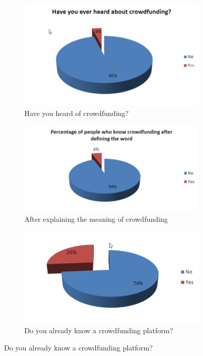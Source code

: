 \begin{center}
      
      \begin{figure}
            \begin{subfigure}{.5\textwidth}
         \centering
         \includegraphics[scale=0.30]{assets/heardCrowd.png}
         \caption{ Have you heard of crowdfunding? }
         \label{fig:heardCrowd}
      \end{subfigure}%
      
      \begin{subfigure}{.5\textwidth}
            \centering
            \includegraphics[scale=0.40]{assets/knowCrowd.png}
            \caption{After explaining the meaning of crowdfunding}
            \label{fig:knowCrowd}
      \end{subfigure}
      
      \begin{subfigure}{.5\textwidth}
            \centering
         \includegraphics[scale=0.30]{assets/knowPlatform.png}
         \caption{Do you already know a crowdfunding platform?}
         \label{fig:knowPlatform}
      \end{subfigure}
      

\end{figure}
\end{center}
